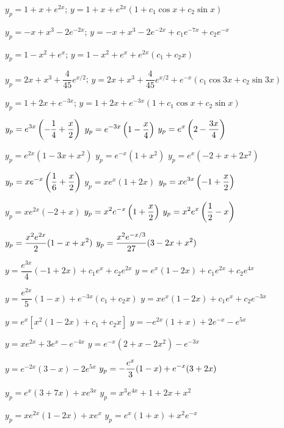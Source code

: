 $y_p=1+x+e^{2x}$;   $y=1+x+e^{2x}(1+c_1\cos x+c_2\sin x)$

$y_p=-x+x^3-2e^{-2x}$;    $y=-x+x^3-2e^{-2x}+c_1e^{-7x}+c_2e^{-x}$

$y_p=1-x^2+e^{x}$;    $y=1-x^2+e^{x}+e^{2x}(c_1+c_2x)$

$y_p=2x+x^3+\dfrac{4}{45}e^{x/2}$;
$y=2x+x^3+\dfrac{4}{45}e^{x/2}+e^{-x}(c_1\cos3x+c_2\sin3x)$

$y_p=1+2x+e^{-3x}$;   $y=1+2x+e^{-3x}(1+c_1\cos x+c_2\sin x)$



 $y_p=\displaystyle{e^{3x}\left(-\frac{1}{4}+\frac{x}{2}\right)}$
 $y_p=\displaystyle{e^{-3x}\left(1-\frac{x}{4}\right)}$
 $y_p=\displaystyle{e^x\left(2-\frac{3x}{4}\right)}$


  $y_p=e^{2x}(1-3x+x^2)$
 $y_p=e^{-x}(1+x^2)$
 $y_p=e^x(-2+x+2x^2)$

 $y_p=\displaystyle{xe^{-x}\left(\frac{1}{6}+\frac{x}{2}\right)}$
 $y_p=xe^x(1+2x)$
 $y_p=\displaystyle{xe^{3x}}\left(-1+\frac{x}{2}\right)$

 $y_p=xe^{2x}(-2+x)$
 $y_p=\displaystyle{x^2e^{-x}\left(1+\frac{x}{2}\right)}$
 $y_p=\displaystyle{x^2e^x\left(\frac{1}{2}-x\right)}$

 $y_p=\displaystyle{\frac{x^2e^{2x}}{2}(1-x+x^2)}$
 $y_p=\displaystyle{\frac{x^2e^{-x/3}}{27}(3-2x+x^2)}$

 $y=\dfrac{e^{3x}}{4}(-1+2x)+c_1e^x+c_2e^{2x}$
  $y=e^x(1-2x)+c_1e^{2x}+c_2e^{4x}$

 $y=\dfrac{e^{2x}}{5}(1-x)+e^{-3x}(c_1+c_2x)$
  $y=xe^x(1-2x)+c_1e^x+c_2e^{-3x}$

$y=e^x\left[x^2(1-2x)+c_1+c_2x\right]$
 $y=-e^{2x}(1+x)+2e^{-x}-e^{5x}$

 $y=xe^{2x}+3e^x-e^{-4x}$
 $y=e^{-x}(2+x-2x^2)-e^{-3x}$

 $y=e^{-2x}(3-x)-2e^{5x}$
 $y_p=-\displaystyle{\frac{e^x}{3}(1-x)+e^{-x}(3+2x)}$

 $y_p=e^x(3+7x)+xe^{3x}$
 $y_p=x^3e^{4x}+1+2x+x^2$

 $y_p=xe^{2x}(1-2x)+xe^x$
 $y_p=e^x(1+x)+x^2e^{-x}$

